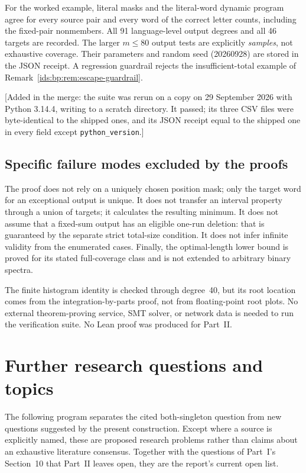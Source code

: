 \documentclass[11pt,letterpaper]{article}
\theoremstyle{definition}\newtheorem{definition}[theorem]{Definition}
\theoremstyle{remark}\newtheorem{remark}[theorem]{Remark}
\theoremstyle{definition}\newtheorem{question}[theorem]{Question}
\begin{document}
For the worked example, literal masks and the literal-word dynamic program
agree for every source pair and every word of the correct letter counts,
including the fixed-pair nonmembers. All 91 language-level output degrees and
all 46 targets are recorded. The larger $m\leq80$ output tests are explicitly
\emph{samples}, not exhaustive coverage. Their parameters and random seed
(20260928) are stored in the JSON receipt. A regression guardrail rejects the
insufficient-total example of Remark~\ref{ids:bp:rem:escape-guardrail}.

[Added in the merge: the suite was rerun on a copy on 29 September 2026 with
Python 3.14.4, writing to a scratch directory. It passed; its three CSV files
were byte-identical to the shipped ones, and its JSON receipt equal to the
shipped one in every field except \texttt{python\_version}.]

\subsection{Specific failure modes excluded by the proofs}
The proof does not rely on a uniquely chosen position mask; only the target
word for an exceptional output is unique. It does not transfer an interval
property through a union of targets; it calculates the resulting minimum.
It does not assume that a fixed-sum output has an eligible one-run deletion:
that is guaranteed by the separate strict total-size condition. It does not
infer infinite validity from the enumerated cases. Finally, the optimal-length
lower bound is proved for its stated full-coverage class and is not extended
to arbitrary binary spectra.

The finite histogram identity is checked through degree~40, but its root
location comes from the integration-by-parts proof, not from floating-point
root plots. No external theorem-proving service, SMT solver, or network data
is needed to run the verification suite. No Lean proof was produced for
Part~II.

\section{Further research questions and topics}
\label{ids:bp:sec:questions}

The following program separates the cited both-singleton question from
new questions suggested by the present construction. Except where a source
is explicitly named, these are proposed research problems rather than claims
about an exhaustive literature consensus. Together with the questions of
Part~I's Section~10 that Part~II leaves open, they are the report's current
open list.
\end{document}
